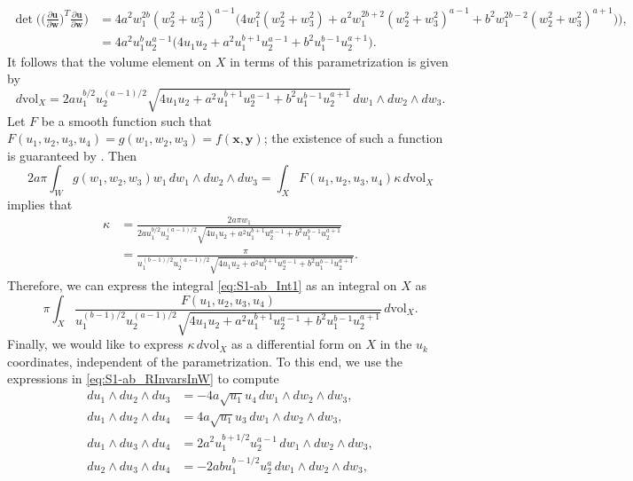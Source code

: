 \documentclass[twoside]{amsart}
\theoremstyle{definition}
\theoremstyle{remark}
\numberwithin{equation}{section}
\newcommand{\vol}{\text{vol}}
\begin{document}
\begin{align*}
    \det \Bigg(\Big(\frac{\partial\mathbf{u}}{\partial\mathbf{w}}\Big)^T \frac{\partial\mathbf{u}}{\partial\mathbf{w}}\Bigg)
    &=
    4 a^2 w_1^{2b} (w_2^2 + w_3^2)^{a-1}\Big(
        4 w_1^2 (w_2^2 + w_3^2) + a^2 w_1^{2b+2} (w_2^2 + w_3^2)^{a-1} + b^2 w_1^{2b-2} (w_2^2 + w_3^2)^{a+1} \big) \Big),
    \\&=
    4 a^2 u_1^b u_2^{a-1}\big(
        4 u_1 u_2 + a^2 u_1^{b+1} u_2^{a-1} + b^2 u_1^{b-1} u_2^{a+1} \big).
\end{align*}
It follows that the volume element on $X$ in terms of this parametrization is given by
\[
    d\vol_X  =
    2 a u_1^{b/2} u_2^{(a-1)/2}\sqrt{
        4 u_1 u_2 + a^2 u_1^{b+1} u_2^{a-1} + b^2 u_1^{b-1} u_2^{a+1}
        } \, dw_1 \wedge dw_2 \wedge dw_3.
\]
Let $F$ be a smooth function such that $F(u_1, u_2, u_3, u_4) = g(w_1, w_2, w_3) = f(\mathbf{x}, \mathbf{y})$;
the existence of such a function is guaranteed by \cite[Thrm.~1]{GWSdiff}. Then
\[
    2a\pi \int_W g(w_1, w_2, w_3) w_1 \, dw_1 \wedge dw_2 \wedge dw_3
    =
    \int_X F(u_1, u_2, u_3, u_4) \kappa \, d\vol_X
\]
implies that
\begin{align*}
    \kappa
    &=
    \frac{2 a \pi w_1}
        {2 a u_1^{b/2} u_2^{(a-1)/2} \sqrt{
            4 u_1 u_2 + a^2 u_1^{b+1} u_2^{a-1} + b^2 u_1^{b-1} u_2^{a+1}
        } }
    \\&=
    \frac{\pi}
        {u_1^{(b-1)/2} u_2^{(a-1)/2} \sqrt{
            4 u_1 u_2 + a^2 u_1^{b+1} u_2^{a-1} + b^2 u_1^{b-1} u_2^{a+1}
        } }.
\end{align*}
Therefore, we can express the integral \eqref{eq:S1-ab_Int1} as an integral on $X$ as
\begin{equation}
\label{eq:S1-ab_Int2}
    \pi \int_X \frac{F(u_1, u_2, u_3, u_4)}{u_1^{(b-1)/2} u_2^{(a-1)/2} \sqrt{
            4 u_1 u_2 + a^2 u_1^{b+1} u_2^{a-1} + b^2 u_1^{b-1} u_2^{a+1}
        } } \, d\vol_X.
\end{equation}
Finally, we would like to express $\kappa\, d\vol_X$ as a differential form on $X$ in the $u_k$ coordinates, independent of the parametrization.
To this end, we use the expressions in \eqref{eq:S1-ab_RInvarsInW} to compute
\begin{align*}
    du_1\wedge du_2 \wedge du_3
    &=      -4 a \sqrt{u_1} u_4 \, dw_1\wedge dw_2 \wedge dw_3,
    \\
    du_1\wedge du_2 \wedge du_4
    &=      4 a \sqrt{u_1} u_3 \, dw_1\wedge dw_2 \wedge dw_3,
    \\
    du_1\wedge du_3 \wedge du_4
    &=      2 a^2 u_1^{b + 1/2} u_2^{a-1} \, dw_1\wedge dw_2 \wedge dw_3,
    \\
    du_2\wedge du_3 \wedge du_4
    &=      -2 a b u_1^{b - 1/2} u_2^a \, dw_1\wedge dw_2 \wedge dw_3,
\end{align*}
\end{document}
